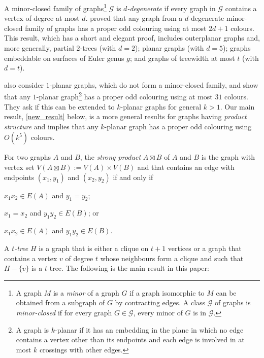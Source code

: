 \documentclass{patmorin}
\begin{document}
A minor-closed family of graphs\footnote{A graph $M$ is a \textit{minor} of a graph $G$ if a graph isomorphic to $M$ can be obtained from a subgraph of $G$ by contracting edges. A class $\mathcal{G}$ of graphs is \emph{minor-closed} if for every graph $G\in\mathcal{G}$, every minor of $G$ is in $\mathcal{G}$.} $\mathcal{G}$ is \emph{$d$-degenerate} if every graph in $\mathcal{G}$ contains a vertex of degree at most $d$.
\citet{cranston.lafferty.ea:note} proved that any graph from a $d$-degenerate minor-closed family of graphs has a proper odd colouring using at most $2d+1$ colours.  This result, which has a short and elegant proof, includes outerplanar graphs and, more generally, partial $2$-trees (with $d=2$); planar graphs (with $d=5$); graphs embeddable on surfaces of Euler genus $g$; and graphs of treewidth at most $t$ (with $d=t$).

\citet{cranston.lafferty.ea:note} also consider $1$-planar graphs, which do not form a minor-closed family, and show that any $1$-planar graph\footnote{A graph is $k$-planar if it has an embedding in the plane in which no edge contains a vertex other than its endpoints and each edge is involved in at most $k$ crossings with other edges.} has a proper odd colouring using at most $31$ colours.  They ask if this can be extended to $k$-planar graphs for general $k>1$.  Our main result, \cref{new_result} below, is a more general results for graphs having \emph{product structure} and implies that any $k$-planar graph has a proper odd colouring using $O(k^5)$ colours.
%

For two graphs $A$ and $B$, the \emph{strong product} $A\boxtimes B$ of $A$ and $B$ is the graph with vertex set $V(A\boxtimes B):=V(A)\times V(B)$ and that contains an edge with endpoints $(x_1,y_1)$ and $(x_2,y_2)$ if and only if
\begin{inparaenum}[(i)]
  \item $x_1x_2\in E(A)$ and $y_1=y_2$;
  \item $x_1=x_2$ and $y_1y_2\in E(B)$; or
  \item $x_1x_2\in E(A)$ and $y_1y_2\in E(B)$.
\end{inparaenum}
A \emph{$t$-tree} $H$ is a graph that is either a clique on $t+1$ vertices or a graph that contains a vertex $v$ of degree $t$ whose neighbours form a clique and such that $H-\{v\}$ is a $t$-tree.  The following is the main result in this paper:
\end{document}
